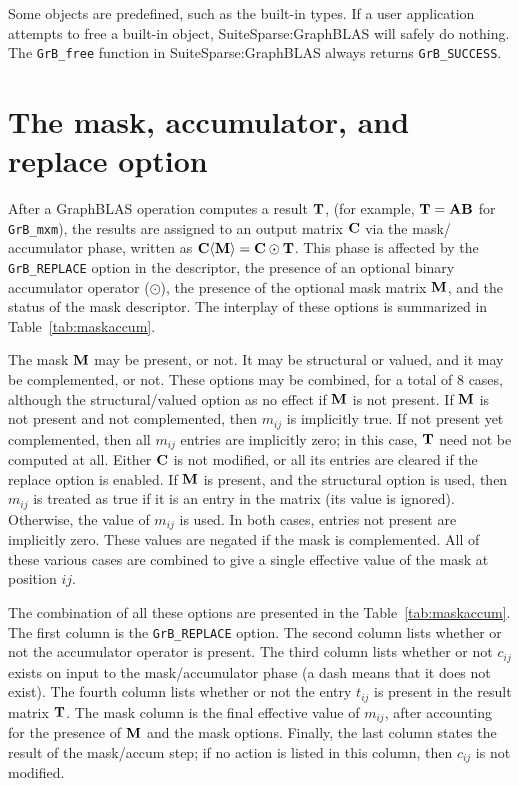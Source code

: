 \documentclass[12pt]{article}
\begin{document}
Some objects are predefined, such as the built-in types.  If a user application
attempts to free a built-in object, SuiteSparse:GraphBLAS will safely do
nothing.  The \verb'GrB_free' function in SuiteSparse:GraphBLAS always
returns \verb'GrB_SUCCESS'.

\newpage
\section{The mask, accumulator, and replace option} %
\label{sec:maskaccum}

After a GraphBLAS operation computes a result ${\bf T}$, (for example, ${\bf
T=AB}$ for \verb'GrB_mxm'), the results are assigned to an output matrix ${\bf
C}$ via the mask/ accumulator phase, written as ${\bf C \langle M \rangle = C
\odot T}$.  This phase is affected by the \verb'GrB_REPLACE' option in the
descriptor, the presence of an optional binary accumulator operator ($\odot$),
the presence of the optional mask matrix ${\bf M}$, and the status of the mask
descriptor.  The interplay of these options is summarized in
Table~\ref{tab:maskaccum}.

The mask ${\bf M}$ may be present, or not.  It may be structural or valued, and
it may be complemented, or not.  These options may be combined, for a total of
8 cases, although the structural/valued option as no effect if ${\bf M}$ is not
present.  If ${\bf M}$ is not present and not complemented, then $m_{ij}$ is
implicitly true.  If not present yet complemented, then all $m_{ij}$ entries are
implicitly zero; in this case, ${\bf T}$ need not be computed at all.  Either
${\bf C}$ is not modified, or all its entries are cleared if the replace option
is enabled.  If ${\bf M}$ is present, and the structural option is used, then
$m_{ij}$ is treated as true if it is an entry in the matrix (its value is
ignored).  Otherwise, the value of $m_{ij}$ is used.  In both cases, entries
not present are implicitly zero.  These values are negated if the mask is
complemented.  All of these various cases are combined to give a single
effective value of the mask at position ${ij}$.

The combination of all these options are presented in the
Table~\ref{tab:maskaccum}.  The first column is the \verb'GrB_REPLACE' option.
The second column lists whether or not the accumulator operator is present.
The third column lists whether or not $c_{ij}$ exists on input to the
mask/accumulator phase (a dash means that it does not exist).  The fourth
column lists whether or not the entry $t_{ij}$ is present in the result matrix
${\bf T}$.  The mask column is the final effective value of $m_{ij}$, after
accounting for the presence of ${\bf M}$ and the mask options.  Finally, the
last column states the result of the mask/accum step; if no action is listed in
this column, then $c_{ij}$ is not modified.
\end{document}
